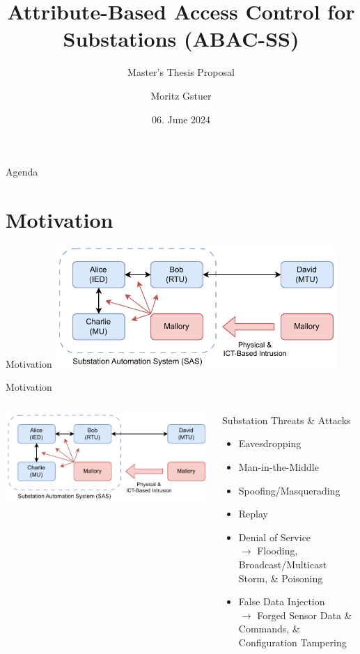 \documentclass[en]{sdqbeamer}
\title[ABAC for Substations]{Attribute-Based Access Control for Substations (ABAC-SS)}
\subtitle{Master's Thesis Proposal}
\author[Moritz Gstuer]{Moritz Gstuer}
\date[06.\,06.\,2024]{06. June 2024}
\begin{document}
 
\KITtitleframe

\begin{frame}{Agenda}
\tableofcontents
\end{frame}

\section{Motivation}
\begin{frame}{Motivation}
    \centering
	\includegraphics[width=0.8\textwidth]{./figures/sas_intrusion.drawio.pdf}
\end{frame}
\begin{frame}{Motivation}
    \begin{columns}
        \centering
        \includegraphics[width=1.0\textwidth]{./figures/sas_intrusion.drawio.pdf}
        \begin{redblock}{Substation Threats \& Attacks}
            \begin{itemize}
                \item Eavesdropping
                \item Man-in-the-Middle
                \item Spoofing/Masquerading
                \item Replay
                \item Denial of Service\\$\rightarrow$ Flooding, Broadcast/Multicast Storm, \& Poisoning
                \item False Data Injection\\$\rightarrow$ Forged Sensor Data \& Commands, \& Configuration Tampering
            \end{itemize}
        \end{redblock}
    \end{columns}
\end{frame}
\end{document}
